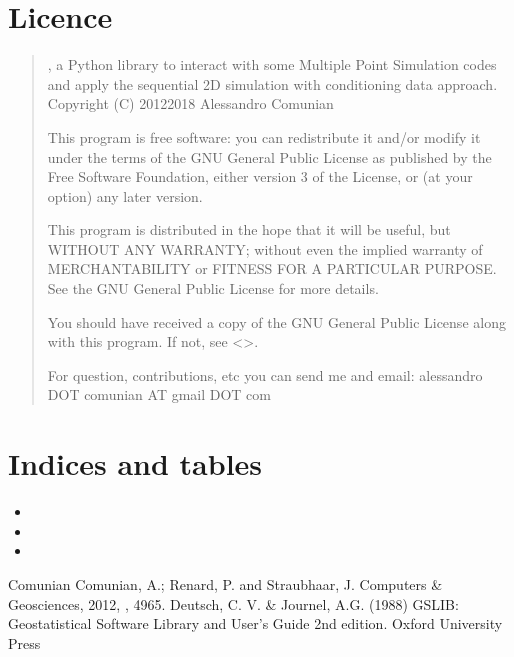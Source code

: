 \documentclass[letterpaper,10pt,english]{sphinxmanual}
\begin{document}
\chapter{Licence}
\label{\detokenize{licence:licence}}\label{\detokenize{licence::doc}}\begin{quote}

, a Python library to interact with some Multiple Point
Simulation codes and apply the sequential 2D simulation with
conditioning data approach.
Copyright (C) 2012\sphinxhyphen{}2018  Alessandro Comunian

This program is free software: you can redistribute it and/or modify
it under the terms of the GNU General Public License as published by
the Free Software Foundation, either version 3 of the License, or
(at your option) any later version.

This program is distributed in the hope that it will be useful,
but WITHOUT ANY WARRANTY; without even the implied warranty of
MERCHANTABILITY or FITNESS FOR A PARTICULAR PURPOSE.  See the
GNU General Public License for more details.

You should have received a copy of the GNU General Public License
along with this program.  If not, see \textless{}\textgreater{}.

For question, contributions, etc you can send me and
e\sphinxhyphen{}mail: alessandro DOT comunian AT gmail DOT com
\end{quote}


\chapter{Indices and tables}
\label{\detokenize{index:indices-and-tables}}\begin{itemize}
\item {} 

\item {} 

\item {} 

\end{itemize}

\begin{sphinxthebibliography}{Comunian}
Comunian, A.; Renard, P. and Straubhaar, J.
 Computers \& Geosciences, 2012, , 49\sphinxhyphen{}65.
Deutsch, C. V. \& Journel, A.G. (1988) GSLIB:
Geostatistical Software Library and User’s Guide 2nd
edition. Oxford University Press
\end{sphinxthebibliography}
\end{document}
